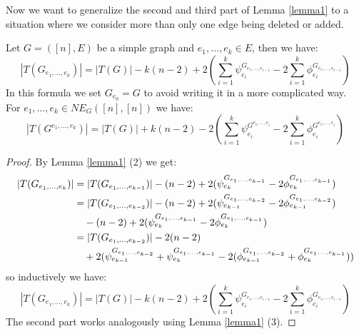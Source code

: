 Now we want to generalize the second and third part of Lemma \ref{lemma1} to a situation where we consider more than only one edge being deleted or added.
\begin{lem}\label{lemma3}
Let \(G=([n],E)\) be a simple graph and \(e_1,\ldots,e_k\in E\), then we have:
\[
|T(G_{e_1,\ldots,e_k})|=|T(G)|-k(n-2)+2(\sum\limits_{i=1}^k\psi_{e_i}^{G_{e_1,\ldots,e_{i-1}}}-2\sum\limits_{i=1}^k\phi_{e_i}^{G_{e_1,\ldots,e_{i-1}}})
\]
In this formula we set \(G_{e_0}=G\) to avoid writing it in a more complicated way.\\
For \(e_1,\ldots,e_k\in NE_G([n],[n])\) we have:
\[
|T(G^{e_1,\ldots,e_k})|=|T(G)|+k(n-2)-2(\sum\limits_{i=1}^k\psi_{e_i}^{G^{e_1,\ldots,e_i}}-2\sum\limits_{i=1}^k\phi_{e_i}^{G^{e_1,\ldots,e_i}})
\]
\begin{proof}
By Lemma \ref{lemma1} (2) we get:
\begin{align}
|T(G_{e_1,\ldots,e_k})|&=|T(G_{e_1,\ldots,e_{k-1}})|-(n-2)+2(\psi_{e_k}^{G_{e_1,\ldots,e_{k-1}}}-2\phi_{e_k}^{G_{e_1,\ldots,e_{k-1}}})\notag\\
&=|T(G_{e_1,\ldots,e_{k-2}})|-(n-2)+2(\psi_{e_{k-1}}^{G_{e_1,\ldots,e_{k-2}}}-2\phi_{e_{k-1}}^{G_{e_1,\ldots,e_{k-2}}})\notag\\
&\quad-(n-2)+2(\psi_{e_k}^{G_{e_1,\ldots,e_{k-1}}}-2\phi_{e_k}^{G_{e_1,\ldots,e_{k-1}}})\notag\\
&=|T(G_{e_1,\ldots,e_{k-2}})|-2(n-2)\notag\\
&\quad+2(\psi_{e_{k-1}}^{G_{e_1,\ldots,e_{k-2}}}+\psi_{e_k}^{G_{e_1,\ldots,e_{k-1}}}-2(\phi_{e_{k-1}}^{G_{e_1,\ldots,e_{k-2}}}+\phi_{e_k}^{G_{e_1,\ldots,e_{k-1}}}))\notag
\end{align}
so inductively we have:
\[
|T(G_{e_1,\ldots,e_k})|=|T(G)|-k(n-2)+2(\sum\limits_{i=1}^k\psi_{e_i}^{G_{e_1,\ldots,e_{i-1}}}-2\sum\limits_{i=1}^k\phi_{e_i}^{G_{e_1,\ldots,e_{i-1}}})
\]
The second part works analogously using Lemma \ref{lemma1} (3). 
\end{proof}
\end{lem}
